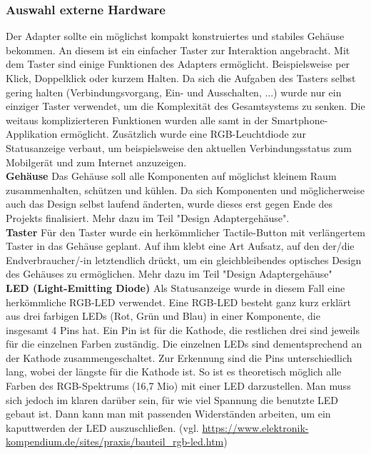 \documentclass[]{article}
\begin{document}
\subsubsection{Auswahl externe Hardware}
Der Adapter sollte ein möglichst kompakt konstruiertes und stabiles Gehäuse bekommen. An diesem ist ein einfacher Taster zur Interaktion angebracht. Mit dem Taster sind einige Funktionen des Adapters ermöglicht. Beispielsweise per Klick, Doppelklick oder kurzem Halten. Da sich die Aufgaben des Tasters selbst gering halten (Verbindungsvorgang, Ein- und Ausschalten, ...) wurde nur ein einziger Taster verwendet, um die Komplexität des Gesamtsystems zu senken. Die weitaus komplizierteren Funktionen wurden alle samt in der Smartphone-Applikation ermöglicht. Zusätzlich wurde eine RGB-Leuchtdiode zur Statusanzeige verbaut, um beispielsweise den aktuellen Verbindungsstatus zum Mobilgerät und zum Internet anzuzeigen. \newline \\
\textbf{Gehäuse} \newline
Das Gehäuse soll alle Komponenten auf möglichst kleinem Raum zusammenhalten, schützen und kühlen. Da sich Komponenten und möglicherweise auch das Design selbst laufend änderten, wurde dieses erst gegen Ende des Projekts finalisiert. Mehr dazu im Teil "Design Adaptergehäuse". \newline \\
\textbf{Taster} \newline
Für den Taster wurde ein herkömmlicher Tactile-Button mit verlängertem Taster in das Gehäuse geplant. Auf ihm klebt eine Art Aufsatz, auf den der/die Endverbraucher/-in letztendlich drückt, um ein gleichbleibendes optisches Design des Gehäuses zu ermöglichen. Mehr dazu im Teil "Design Adaptergehäuse"\newline \\
\textbf{LED (Light-Emitting Diode)} \newline
Als Statusanzeige wurde in diesem Fall eine herkömmliche RGB-LED verwendet. Eine RGB-LED besteht ganz kurz erklärt aus drei farbigen LEDs (Rot, Grün und Blau) in einer Komponente, die insgesamt 4 Pins hat. Ein Pin ist für die Kathode, die restlichen drei sind jeweils für die einzelnen Farben zuständig. Die einzelnen LEDs sind dementsprechend an der Kathode zusammengeschaltet. Zur Erkennung sind die Pins unterschiedlich lang, wobei der längste für die Kathode ist. So ist es theoretisch möglich alle Farben des RGB-Spektrums (16,7 Mio) mit einer LED darzustellen.\newline
Man muss sich jedoch im klaren darüber sein, für wie viel Spannung die benutzte LED gebaut ist. Dann kann man mit passenden Widerständen arbeiten, um ein kaputtwerden der LED auszuschließen.
\vspace{4mm} \newline
(vgl. \url{https://www.elektronik-kompendium.de/sites/praxis/bauteil_rgb-led.htm})
\end{document}
